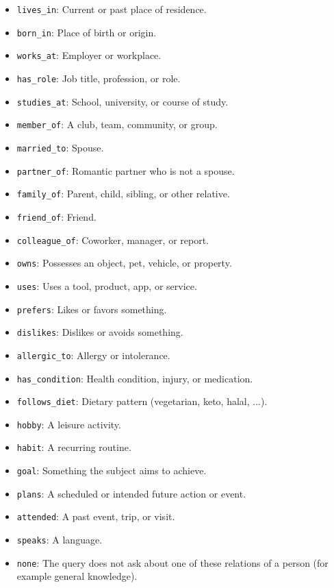 \documentclass[11pt]{article}
\begin{document}
\begin{itemize}
\item \texttt{lives\_\allowbreak{}in}: Current or past place of residence.
\item \texttt{born\_\allowbreak{}in}: Place of birth or origin.
\item \texttt{works\_\allowbreak{}at}: Employer or workplace.
\item \texttt{has\_\allowbreak{}role}: Job title, profession, or role.
\item \texttt{studies\_\allowbreak{}at}: School, university, or course of study.
\item \texttt{member\_\allowbreak{}of}: A club, team, community, or group.
\item \texttt{married\_\allowbreak{}to}: Spouse.
\item \texttt{partner\_\allowbreak{}of}: Romantic partner who is not a spouse.
\item \texttt{family\_\allowbreak{}of}: Parent, child, sibling, or other relative.
\item \texttt{friend\_\allowbreak{}of}: Friend.
\item \texttt{colleague\_\allowbreak{}of}: Coworker, manager, or report.
\item \texttt{owns}: Possesses an object, pet, vehicle, or property.
\item \texttt{uses}: Uses a tool, product, app, or service.
\item \texttt{prefers}: Likes or favors something.
\item \texttt{dislikes}: Dislikes or avoids something.
\item \texttt{allergic\_\allowbreak{}to}: Allergy or intolerance.
\item \texttt{has\_\allowbreak{}condition}: Health condition, injury, or medication.
\item \texttt{follows\_\allowbreak{}diet}: Dietary pattern (vegetarian, keto, halal, ...).
\item \texttt{hobby}: A leisure activity.
\item \texttt{habit}: A recurring routine.
\item \texttt{goal}: Something the subject aims to achieve.
\item \texttt{plans}: A scheduled or intended future action or event.
\item \texttt{attended}: A past event, trip, or visit.
\item \texttt{speaks}: A language.
\item \texttt{none}: The query does not ask about one of these relations of a person (for example general knowledge).
\end{itemize}
\end{document}
